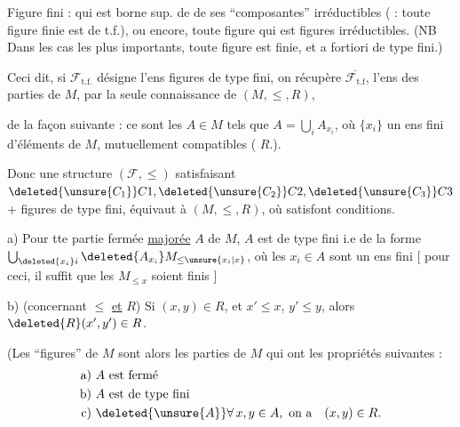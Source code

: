 Figure  fini : qui est borne sup. de  de ses ``composantes'' irréductibles ( : toute figure finie est de t.f.), ou encore, toute figure  qui est  figures irréductibles.  (NB Dans les cas les plus importants, toute figure est finie, et a fortiori de type fini.)

Ceci dit, si $\mathcal F_{\mathrm{t.f.}}$ désigne l'ens figures de type fini, on récupère $\overline{\mathcal F_{\mathrm{t.f}}}$, l'ens des parties  de $M$, par la seule connaissance de $(M,\leq,R)$,

de la façon suivante : ce sont les $A\in M$ tels que $A=\bigcup_i A_{x_i}$, où  $\{x_i\}$  un ens fini d'éléments de $M$, mutuellement compatibles ( $R$.).

Donc une structure $(\mathcal F,\leq)$ satisfaisant $\deleted{\unsure{C_1}}C1,\deleted{\unsure{C_2}}C2,\deleted{\unsure{C_3}}C3$ + figures  de type fini, équivaut à $(M,\leq,R)$, où   satisfont  conditions.

a)  Pour tte partie fermée \uline{majorée} $A$\deleted{\unsure{,}} de $M$, $A$ est de type fini i.e de la forme $\bigcup_{\deleted{x_i}i}\deleted{A_{x_i}}M_{\leq\unsure{x_i|x}}$, où les $x_i\in A$  sont un ens fini [ pour ceci, il suffit que les $M_{\leq x}$ soient finis ]


b) (concernant $\leq$ \uline{et} $R$) Si $(x,y)\in R$, et $x'\leq x$, $y'\leq y$, alors $\deleted{R}(x',y')\in R$.


(Les ``figures'' de $M$ sont alors les parties  de $M$ qui ont les propriétés suivantes :
\[
\begin{aligned}
\text{a) } & A\text{ est fermé}\\
\text{b) } & A\text{ est de type fini}\\
\text{c) } & \deleted{\unsure{A}}\forall\,x,y\in A,\ \text{on a}\quad (x,y)\in R.
\end{aligned}
\]

